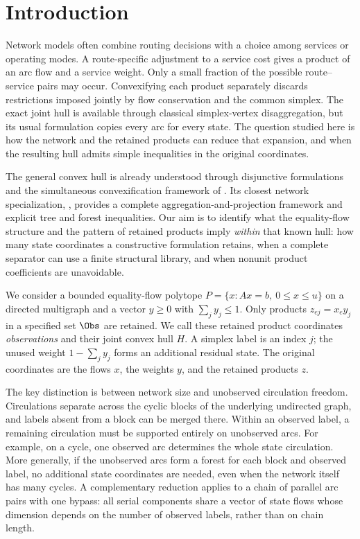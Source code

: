 \section{Introduction}\label{sec:introduction}
Network models often combine routing decisions with a choice among services
or operating modes. A route-specific adjustment to a service cost gives a
product of an arc flow and a service weight. Only a small fraction of the
possible route--service pairs may occur. Convexifying each product separately
discards restrictions imposed jointly by flow conservation and the common
simplex. The exact joint hull is available through classical simplex-vertex
disaggregation, but its usual formulation copies every arc for every state.
The question studied here is how the network and the retained products can
reduce that expansion, and when the resulting hull admits simple inequalities
in the original coordinates.

The general convex hull is already understood through disjunctive
formulations and the simultaneous convexification framework of
\citet{DavarniaRichardTawarmalani2017}. Its closest network specialization,
\citet{KhademniaDavarnia2025}, provides a complete aggregation-and-projection
framework and explicit tree and forest inequalities. Our aim is to identify
what the equality-flow structure and the pattern of retained products imply
\emph{within} that known hull: how many state coordinates a constructive
formulation retains, when a complete separator can use a finite structural
library, and when nonunit product coefficients are unavoidable.

We consider a bounded equality-flow polytope
$P=\{x:Ax=b,\ 0\le x\le u\}$ on a directed multigraph and a vector
$y\ge0$ with $\sum_jy_j\le1$. Only products $z_{ej}=x_e y_j$ in a
specified set $\Obs$ are retained. We call these retained product coordinates \emph{observations}
and their joint convex hull $H$. A simplex label is an index $j$;
the unused weight $1-\sum_jy_j$ forms an additional residual state.
The original coordinates are the flows $x$, the weights $y$, and the retained
products $z$.

The key distinction is between network size and unobserved circulation
freedom. Circulations separate across the cyclic blocks of the underlying
undirected graph, and labels absent from a block can be merged there. Within
an observed label, a remaining circulation must be supported entirely on
unobserved arcs. For example, on a cycle, one observed arc determines the
whole state circulation. More generally, if the unobserved arcs form a forest
for each block and observed label, no additional state coordinates are
needed, even when the network itself has many cycles. A complementary
reduction applies to a chain of parallel arc pairs with one bypass: all
serial components share a vector of state flows whose dimension depends on
the number of observed labels, rather than on chain length.

